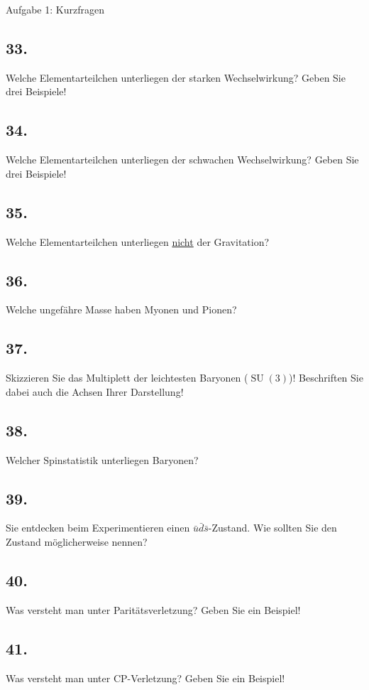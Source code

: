 \begin{aufgabe}{Aufgabe 1: Kurzfragen}
    \subsection{33.}
    Welche Elementarteilchen unterliegen der starken Wechselwirkung?
    Geben Sie drei Beispiele!

    \subsection{34.}
    Welche Elementarteilchen unterliegen der schwachen Wechselwirkung?
    Geben Sie drei Beispiele!

    \subsection{35.}
    Welche Elementarteilchen unterliegen \underline{nicht} der Gravitation?

    \subsection{36.}
    Welche ungefähre Masse haben Myonen und Pionen?

    \subsection{37.}
    Skizzieren Sie das Multiplett der leichtesten Baryonen ($\operatorname{SU}(3)$)!
    Beschriften Sie dabei auch die Achsen Ihrer Darstellung!

    \subsection{38.}
    Welcher Spinstatistik unterliegen Baryonen?

    \subsection{39.}
    Sie entdecken beim Experimentieren einen $\bar u \bar d \bar s$-Zustand.
    Wie sollten Sie den Zustand möglicherweise nennen?

    \subsection{40.}
    Was versteht man unter Paritätsverletzung?
    Geben Sie ein Beispiel!

    \subsection{41.}
    Was versteht man unter CP-Verletzung?
    Geben Sie ein Beispiel!


\end{aufgabe}
